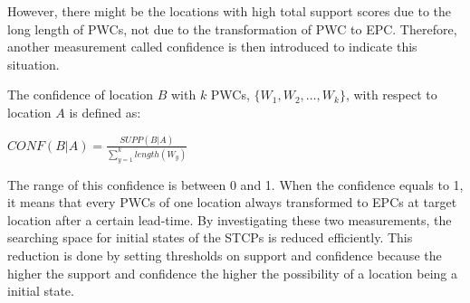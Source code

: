 \documentclass{acm_proc_article-sp}
\begin{document}
\newline 
However, there might be the locations with high total support scores due to the long length of PWCs, not due to the transformation of PWC to EPC. Therefore, another measurement called confidence is then introduced to indicate this situation. 
\begin{mydef}
\label{def:confidence}
The confidence of location $B$ with $k$ PWCs,  $\{ W_1 , W_2 , \ldots , W_k \}$, with respect to location $A$ is defined as: 
\begin{center}
    $ CONF(B|A) = \frac{SUPP(B|A)}{\sum_{y=1}^{k} length(W_y)} $
\end{center}
\end{mydef}
The range of this confidence is between 0 and 1. When the confidence equals to 1, it means that every PWCs of one location always transformed to EPCs at target location after a certain lead-time. 
\newline
By investigating these two measurements, the searching space for initial states of the STCPs is reduced efficiently. This reduction is done by setting thresholds on support and confidence because the higher the support and confidence the higher the possibility of a location being a initial state.
\end{document}
